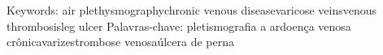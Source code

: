 Keywords: air plethysmographychronic venous diseasevaricose veinsvenous
thrombosisleg ulcer
Palavras-chave: pletismografia a ardoença venosa crônicavarizestrombose
venosaúlcera de perna
